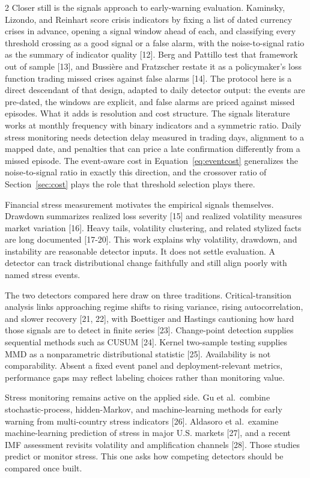 \documentclass{book}
\makeatletter
\def\my@tag@font{\normalsize}
\let\amsmath@eqref\eqref
\renewcommand\eqref[1]{{\let\my@tag@font\relax\amsmath@eqref{#1}}}
\makeatother
\begin{document}
\begin{multicols}{2}
Closer still is the signals approach to early-warning evaluation. Kaminsky, Lizondo, and Reinhart score crisis indicators by fixing a list of dated currency crises in advance, opening a signal window ahead of each, and classifying every threshold crossing as a good signal or a false alarm, with the noise-to-signal ratio as the summary of indicator quality [12]. Berg and Pattillo test that framework out of sample [13], and Bussi{\`e}re and Fratzscher restate it as a policymaker's loss function trading missed crises against false alarms [14]. The protocol here is a direct descendant of that design, adapted to daily detector output: the events are pre-dated, the windows are explicit, and false alarms are priced against missed episodes. What it adds is resolution and cost structure. The signals literature works at monthly frequency with binary indicators and a symmetric ratio. Daily stress monitoring needs detection delay measured in trading days, alignment to a mapped date, and penalties that can price a late confirmation differently from a missed episode. The event-aware cost in Equation~\eqref{eq:eventcost} generalizes the noise-to-signal ratio in exactly this direction, and the crossover ratio of Section~\ref{sec:cost} plays the role that threshold selection plays there.

Financial stress measurement motivates the empirical signals themselves. Drawdown summarizes realized loss severity [15] and realized volatility measures market variation [16]. Heavy tails, volatility clustering, and related stylized facts are long documented [17-20]. This work explains why volatility, drawdown, and instability are reasonable detector inputs. It does not settle evaluation. A detector can track distributional change faithfully and still align poorly with named stress events.

The two detectors compared here draw on three traditions. Critical-transition analysis links approaching regime shifts to rising variance, rising autocorrelation, and slower recovery [21, 22], with Boettiger and Hastings cautioning how hard those signals are to detect in finite series [23]. Change-point detection supplies sequential methods such as CUSUM [24]. Kernel two-sample testing supplies MMD as a nonparametric distributional statistic [25]. Availability is not comparability. Absent a fixed event panel and deployment-relevant metrics, performance gaps may reflect labeling choices rather than monitoring value.

Stress monitoring remains active on the applied side. Gu et al.\ combine stochastic-process, hidden-Markov, and machine-learning methods for early warning from multi-country stress indicators [26]. Aldasoro et al.\ examine machine-learning prediction of stress in major U.S. markets [27], and a recent IMF assessment revisits volatility and amplification channels [28]. Those studies predict or monitor stress. This one asks how competing detectors should be compared once built.


\end{multicols}
\end{document}
